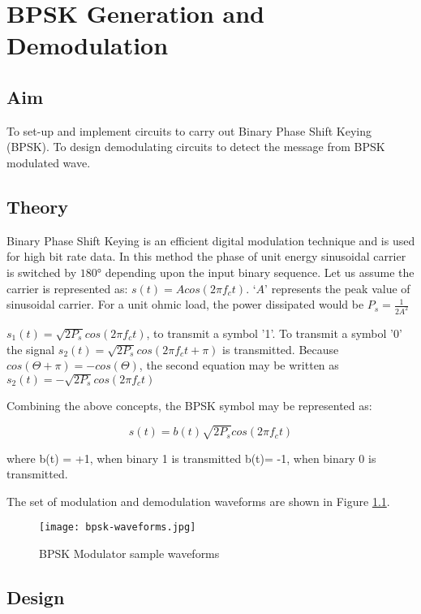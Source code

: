\chapter[BPSK Generation and Demodulation]{BPSK Generation and Demodulation}

\section*{Aim}
To set-up and implement circuits to carry out Binary Phase Shift Keying (BPSK). To design demodulating circuits to detect the message from BPSK modulated wave.
\section*{Theory}

Binary Phase Shift Keying is an efficient digital modulation technique and is used for high bit rate data. In this method the phase of unit energy sinusoidal carrier is switched by $180°$ depending upon the input binary sequence. 
\noindent
Let us assume the carrier is represented as: $s(t) = A cos(2\pi f_ct)$.
\noindent
`$A$' represents the peak value of sinusoidal carrier. For a unit ohmic load, the power dissipated would be $P_s = \frac{1}{2A^2}$


\noindent
$ s_1(t) = \sqrt{2P_s} cos (2\pi f_ct) $, to transmit a symbol '1'.
\noindent
To transmit a symbol '0' the signal $ s_2(t) = \sqrt{2P_s} cos (2\pi f_ct + \pi) $ is transmitted. Because $cos (\Theta+\pi) = -cos (\Theta)$, the second equation may be written as $ s_2(t) = - \sqrt{2P_s} cos (2\pi f_ct) $

Combining the above concepts, the BPSK symbol may be represented as:

\begin{equation*}
s(t)= b(t)  \sqrt{2P_s} cos (2\pi f_ct) 
\end{equation*}


where b(t) = +1, when binary 1 is transmitted
b(t)= -1, when binary 0 is transmitted.

The set of modulation and demodulation waveforms are shown in Figure \ref{bpsk-waveforms}.

\begin{figure}[h]
	\texttt{[image: bpsk-waveforms.jpg]}
	\caption{BPSK Modulator sample waveforms}
	\label{bpsk-waveforms}
\end{figure}


\section*{Design}
